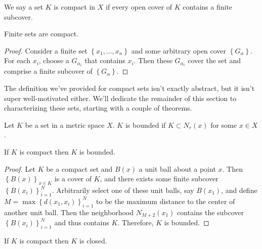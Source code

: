 \documentclass[../m131main.tex]{subfiles}
\begin{document}
\begin{definition}
    We say a set $K$ is compact in $X$ if every open cover of $K$ contains a finite subcover.
\end{definition}

\begin{theorem}[]
    Finite sets are compact.
\end{theorem}

\begin{proof}
    Consider a finite set $\left\{ x_1, \ldots, x_n \right\}$ and some arbitrary open cover $\left\{ G_\alpha \right\}$.
    For each $x_i$, choose a $G_{\alpha_i}$ that contains $x_i$.
    Then these $G_{\alpha_i}$ cover the set and comprise a finite subcover of $\left\{ G_\alpha \right\}$.
\end{proof}

The definition we've provided for compact sets isn't exactly abstract, but it isn't super well-motivated either.
We'll dedicate the remainder of this section to characterizing these sets, starting with a couple of theorems.

\begin{definition}
    Let $K$ be a set in a metric space $X$.
    $K$ is bounded if $K \subset N_r(x)$ for some $x \in X$.
\end{definition}

\begin{theorem}
    If $K$ is compact then $K$ is bounded.
\end{theorem}

\begin{proof}
    Let $K$ be a compact set and $B(x)$ a unit ball about a point $x$.
    Then $\left\{ B(x) \right\}_{x \in K}$ is a cover of $K$, and there exists some finite subcover $\left\{ B(x_i) \right\}_{i=1}^N$.
    Arbitrarily select one of these unit balls, say $B(x_1)$, and define $M = \max \left\{ d(x_1, x_i) \right\}_{i=1}^N$ to be the maximum distance to the center of another unit ball.
    Then the neighborhood $N_{M+2}(x_1)$ contains the subcover $\left\{ B(x_i) \right\}_{i=1}^N$ and thus contains $K$.
    Therefore, $K$ is bounded.
\end{proof}

\begin{theorem}
    If $K$ is compact then $K$ is closed.
\end{theorem}
\end{document}
